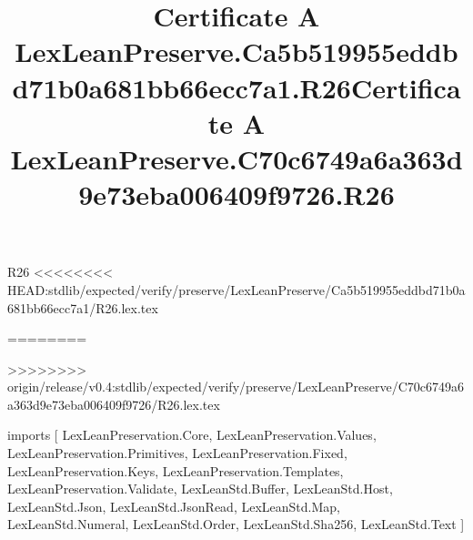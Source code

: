 \begin{lexlean}{R26}
<<<<<<<< HEAD:stdlib/expected/verify/preserve/LexLeanPreserve/Ca5b519955eddbd71b0a681bb66ecc7a1/R26.lex.tex
\title{Certificate A LexLeanPreserve.Ca5b519955eddbd71b0a681bb66ecc7a1.R26}
========
\title{Certificate A LexLeanPreserve.C70c6749a6a363d9e73eba006409f9726.R26}
>>>>>>>> origin/release/v0.4:stdlib/expected/verify/preserve/LexLeanPreserve/C70c6749a6a363d9e73eba006409f9726/R26.lex.tex
\begin{coremodule}
imports [
  LexLeanPreservation.Core,
  LexLeanPreservation.Values,
  LexLeanPreservation.Primitives,
  LexLeanPreservation.Fixed,
  LexLeanPreservation.Keys,
  LexLeanPreservation.Templates,
  LexLeanPreservation.Validate,
  LexLeanStd.Buffer,
  LexLeanStd.Host,
  LexLeanStd.Json,
  LexLeanStd.JsonRead,
  LexLeanStd.Map,
  LexLeanStd.Numeral,
  LexLeanStd.Order,
  LexLeanStd.Sha256,
  LexLeanStd.Text
]


\end{coremodule}
\end{lexlean}
